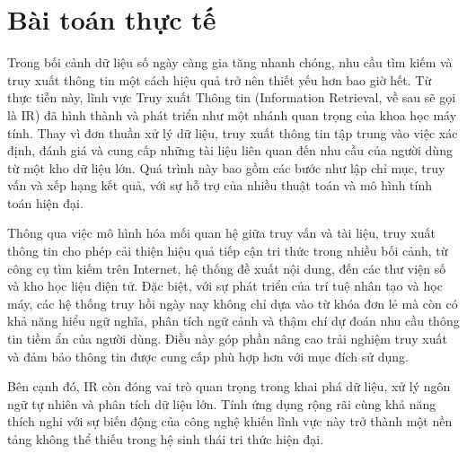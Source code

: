 \section{Bài toán thực tế}
Trong bối cảnh dữ liệu số ngày càng gia tăng nhanh chóng, nhu cầu tìm kiếm và truy xuất thông tin một cách hiệu quả trở nên thiết yếu hơn bao giờ hết. Từ thực tiễn này, lĩnh vực Truy xuất Thông tin (Information Retrieval, về sau sẽ gọi là IR) đã hình thành và phát triển như một nhánh quan trọng của khoa học máy tính. Thay vì đơn thuần xử lý dữ liệu, truy xuất thông tin tập trung vào việc xác định, đánh giá và cung cấp những tài liệu liên quan đến nhu cầu của người dùng từ một kho dữ liệu lớn. Quá trình này bao gồm các bước như lập chỉ mục, truy vấn và xếp hạng kết quả, với sự hỗ trợ của nhiều thuật toán và mô hình tính toán hiện đại.

Thông qua việc mô hình hóa mối quan hệ giữa truy vấn và tài liệu, truy xuất thông tin cho phép cải thiện hiệu quả tiếp cận tri thức trong nhiều bối cảnh, từ công cụ tìm kiếm trên Internet, hệ thống đề xuất nội dung, đến các thư viện số và kho học liệu điện tử. Đặc biệt, với sự phát triển của trí tuệ nhân tạo và học máy, các hệ thống truy hồi ngày nay không chỉ dựa vào từ khóa đơn lẻ mà còn có khả năng hiểu ngữ nghĩa, phân tích ngữ cảnh và thậm chí dự đoán nhu cầu thông tin tiềm ẩn của người dùng. Điều này góp phần nâng cao trải nghiệm truy xuất và đảm bảo thông tin được cung cấp phù hợp hơn với mục đích sử dụng.

Bên cạnh đó, IR còn đóng vai trò quan trọng trong khai phá dữ liệu, xử lý ngôn ngữ tự nhiên và phân tích dữ liệu lớn. Tính ứng dụng rộng rãi cùng khả năng thích nghi với sự biến động của công nghệ khiến lĩnh vực này trở thành một nền tảng không thể thiếu trong hệ sinh thái tri thức hiện đại.